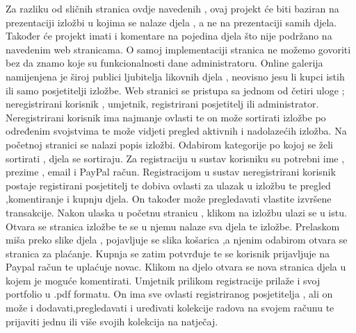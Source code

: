 		\vspace{10mm} 
			
		
		{Za razliku od sličnih stranica ovdje navedenih , ovaj projekt će biti baziran na prezentaciji izložbi u kojima se nalaze djela , a ne na prezentaciji samih djela. 
			Također će projekt 	imati i komentare na pojedina djela što nije podržano na navedenim web stranicama. O samoj implementaciji stranica ne možemo govoriti bez da znamo koje su funkcionalnosti  dane administratoru.
			\newline Online galerija namijenjena je široj publici ljubitelja likovnih djela , neovisno jesu li kupci istih ili samo posjetitelji izložbe.
			\vspace{3mm}
			\newline Web stranici se pristupa sa jednom od četiri uloge ; neregistrirani korisnik , umjetnik, registrirani posjetitelj ili administrator. Neregistrirani korisnik ima najmanje ovlasti te on može  sortirati izložbe po određenim svojstvima te može vidjeti pregled aktivnih i nadolazećih izložba. 
			\newline Na početnoj stranici se nalazi popis izložbi. Odabirom kategorije po kojoj se želi sortirati , djela se sortiraju.
			\newline Za registraciju u sustav korisniku su potrebni ime , prezime , email i PayPal račun.
			\vspace{3mm}
			\newline Registracijom u sustav neregistrirani korisnik postaje registirani posjetitelj te dobiva ovlasti za ulazak u izložbu te pregled ,komentiranje i kupnju djela. On također može  pregledavati vlastite izvršene transakcije.
			\newline Nakon ulaska u početnu stranicu , klikom na izložbu ulazi se u istu. Otvara se stranica izložbe te se u njemu nalaze sva djela te izložbe.
			\newline Prelaskom miša preko slike djela , pojavljuje se slika košarica ,a njenim odabirom otvara se stranica za plaćanje. Kupnja se zatim potvrđuje te se korisnik prijavljuje na Paypal račun te uplaćuje novac. 
			\newline Klikom na djelo otvara se nova stranica djela u kojem je moguće komentirati. 
			\vspace{3mm}
			\newline Umjetnik prilikom registracije prilaže i svoj portfolio u .pdf formatu. On ima sve ovlasti registriranog posjetitelja , ali on može i dodavati,pregledavati i uređivati kolekcije radova na  svojem računu te prijaviti jednu ili više svojih kolekcija na natječaj.
}
